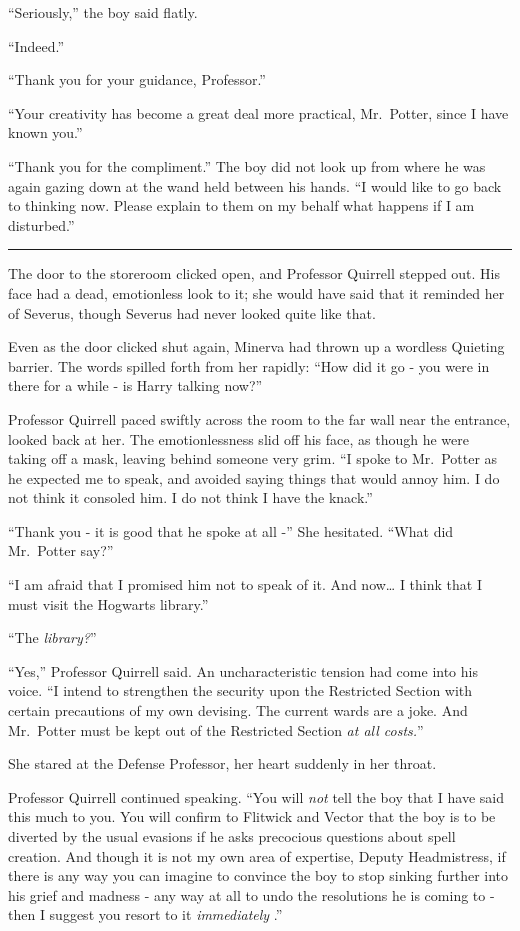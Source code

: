 ``Seriously,'' the boy said flatly.

``Indeed.''

``Thank you for your guidance, Professor.''

``Your creativity has become a great deal more practical, Mr.~Potter,
since I have known you.''

``Thank you for the compliment.'' The boy did not look up from where he
was again gazing down at the wand held between his hands. ``I would like
to go back to thinking now. Please explain to them on my behalf what
happens if I am disturbed.''

\begin{center}\rule{3in}{0.4pt}\end{center}

The door to the storeroom clicked open, and Professor Quirrell stepped
out. His face had a dead, emotionless look to it; she would have said
that it reminded her of Severus, though Severus had never looked quite
like that.

Even as the door clicked shut again, Minerva had thrown up a wordless
Quieting barrier. The words spilled forth from her rapidly: ``How did it
go - you were in there for a while - is Harry talking now?''

Professor Quirrell paced swiftly across the room to the far wall near
the entrance, looked back at her. The emotionlessness slid off his face,
as though he were taking off a mask, leaving behind someone very grim.
``I spoke to Mr.~Potter as he expected me to speak, and avoided saying
things that would annoy him. I do not think it consoled him. I do not
think I have the knack.''

``Thank you - it is good that he spoke at all -'' She hesitated. ``What
did Mr.~Potter say?''

``I am afraid that I promised him not to speak of it. And now\ldots{} I
think that I must visit the Hogwarts library.''

``The \emph{library?}''

``Yes,'' Professor Quirrell said. An uncharacteristic tension had come
into his voice. ``I intend to strengthen the security upon the
Restricted Section with certain precautions of my own devising. The
current wards are a joke. And Mr.~Potter must be kept out of the
Restricted Section \emph{at all costs.}''

She stared at the Defense Professor, her heart suddenly in her throat.

Professor Quirrell continued speaking. ``You will \emph{not} tell the
boy that I have said this much to you. You will confirm to Flitwick and
Vector that the boy is to be diverted by the usual evasions if he asks
precocious questions about spell creation. And though it is not my own
area of expertise, Deputy Headmistress, if there is any way you can
imagine to convince the boy to stop sinking further into his grief and
madness - any way at all to undo the resolutions he is coming to - then
I suggest you resort to it \emph{immediately} .''
